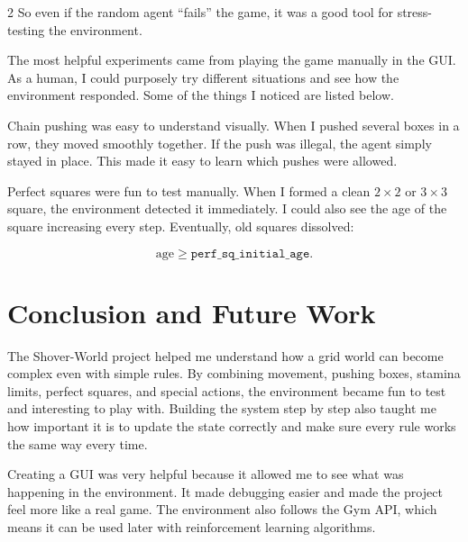 \documentclass[a4paper]{article}
\begin{document}
\begin{multicols}{2}
So even if the random agent “fails” the game, it was a good tool for stress-testing the environment.


The most helpful experiments came from playing the game manually in the GUI. As a human, I could purposely try different situations and see how the environment responded. Some of the things I noticed are listed below.


Chain pushing was easy to understand visually. When I pushed several boxes in a row, they moved smoothly together. If the push was illegal, the agent simply stayed in place. This made it easy to learn which pushes were allowed.


Perfect squares were fun to test manually. When I formed a clean \(2\times 2\) or \(3\times 3\) square, the environment detected it immediately. I could also see the age of the square increasing every step. Eventually, old squares dissolved:

\[
\text{age} \ge \texttt{perf\_sq\_initial\_age}.
\]



\section{Conclusion and Future Work}

The Shover-World project helped me understand how a grid world can become complex even with simple rules. By combining movement, pushing boxes, stamina limits, perfect squares, and special actions, the environment became fun to test and interesting to play with. Building the system step by step also taught me how important it is to update the state correctly and make sure every rule works the same way every time.

Creating a GUI was very helpful because it allowed me to see what was happening in the environment. It made debugging easier and made the project feel more like a real game. The environment also follows the Gym API, which means it can be used later with reinforcement learning algorithms.



\end{multicols}


%
\end{document}
